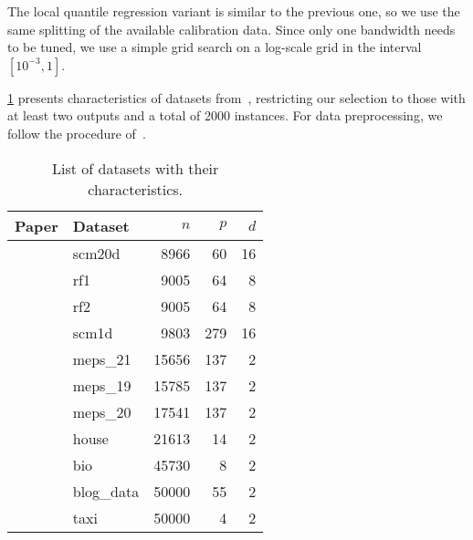   The local quantile regression variant is similar to the previous one, so we use the same splitting of the available calibration data. Since only one bandwidth needs to be tuned, we use a simple grid search on a log-scale grid in the interval $[10^{-3}, 1]$.

  \cref{table:datasets} presents characteristics of datasets from~\citep{Tsoumakas2011-wf,Feldman2023-cc,wang2023probabilistic}, restricting our selection to those with at least two outputs and a total of 2000 instances. For data preprocessing, we follow the procedure of~\citep{Grinsztajn2022-nu}.

  \begin{table}[h]
  \centering
    \begin{tabular}{llrrr}
      \toprule
      Paper & Dataset & $n$ & $p$ & $d$ \\
      \midrule
      \multirow[t]{4}{*}{\citet{Tsoumakas2011-wf}} & scm20d & 8966 & 60 & 16 \\
       & rf1 & 9005 & 64 & 8 \\
       & rf2 & 9005 & 64 & 8 \\
       & scm1d & 9803 & 279 & 16 \\
      \multirow[t]{6}{*}{\citet{Feldman2023-cc}} & meps\_21 & 15656 & 137 & 2 \\
       & meps\_19 & 15785 & 137 & 2 \\
       & meps\_20 & 17541 & 137 & 2 \\
       & house & 21613 & 14 & 2 \\
       & bio & 45730 & 8 & 2 \\
     & blog\_data & 50000 & 55 & 2 \\
      \citet{wang2023probabilistic} & taxi & 50000 & 4 & 2 \\
      \bottomrule
    \end{tabular}
    \caption{List of datasets with their characteristics.}
  \label{table:datasets}
  \end{table}
